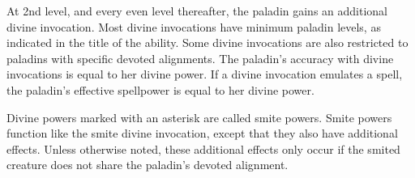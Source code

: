         At 2nd level, and every even level thereafter, the paladin gains an additional divine invocation.
        Most divine invocations have minimum paladin levels, as indicated in the title of the ability.
        Some divine invocations are also restricted to paladins with specific devoted alignments.
        The paladin's accuracy with divine invocations is equal to her divine power.
        If a divine invocation emulates a spell, the paladin's effective spellpower is equal to her divine power.

        Divine powers marked with an asterisk are called smite powers.
        Smite powers function like the smite divine invocation, except that they also have additional effects.
        Unless otherwise noted, these additional effects only occur if the smited creature does not share the paladin's devoted alignment.


